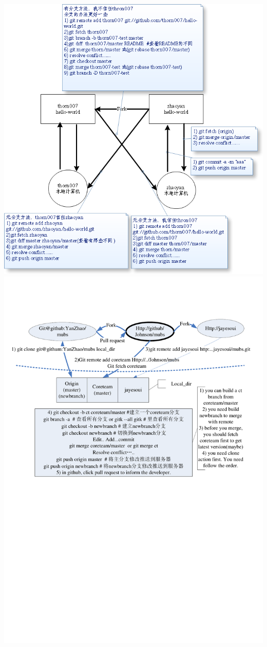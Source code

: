 \documentclass[a4paper,11pt,twoside]{book}
\begin{document}
\includegraphics[scale=0.8]{pics/git-corp} \\

\includegraphics[scale=0.7]{pics/Visio-git_cooperate}
\end{document}
